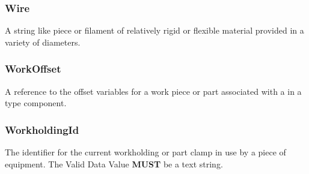 \subsubsection{Wire}
  \label{sec:Wire}



A string like piece or filament of relatively rigid or flexible material provided in a variety of diameters.

\FloatBarrier

\subsubsection{WorkOffset}
  \label{sec:WorkOffset}



A reference to the offset variables for a work piece or part associated with a  in a  type component.

\FloatBarrier

\subsubsection{WorkholdingId}
  \label{sec:WorkholdingId}



The identifier for the current workholding or part clamp in use by a piece of equipment. 
 The \gls{Valid Data Value} \textbf{MUST} be a text string.

\FloatBarrier
